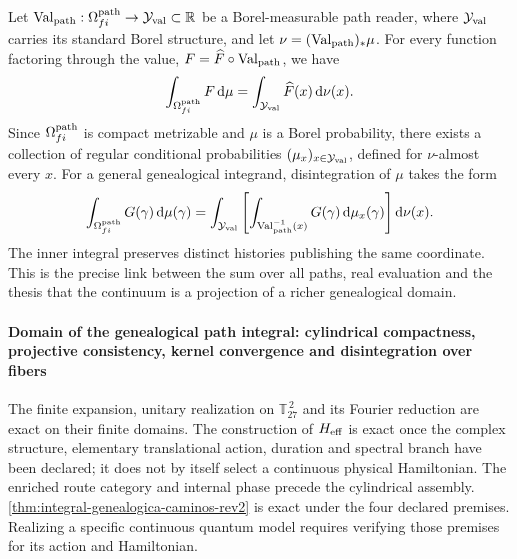 Let
\(\operatorname{Val}_{\rm path}:\Omega^{\rm path}_{fi}\to\mathcal Y_{\rm val}\subset\mathbb R\)
be a Borel-measurable path reader, where \(\mathcal Y_{\rm val}\) carries its standard
Borel structure, and let
\(\nu=(\operatorname{Val}_{\rm path})_*\mu\). For every function
factoring through the value, \(F=\widehat F\circ\operatorname{Val}_{\rm path}\),
we have
\[
 \int_{\Omega^{\rm path}_{fi}}F\,\mathrm d\mu
 =\int_{\mathcal Y_{\rm val}}\widehat F(x)\,\mathrm d\nu(x).
\]
Since \(\Omega^{\rm path}_{fi}\) is compact metrizable and \(\mu\) is a
Borel probability, there exists a collection of regular conditional
probabilities \((\mu_x)_{x\in\mathcal Y_{\rm val}}\), defined for \(\nu\)-almost every \(x\). For
a general genealogical integrand, disintegration of \(\mu\) takes the form
\begin{equation}
 \int_{\Omega^{\rm path}_{fi}}G(\gamma)\,\mathrm d\mu(\gamma)
 =\int_{\mathcal Y_{\rm val}}\left[
   \int_{\operatorname{Val}_{\rm path}^{-1}(x)}
   G(\gamma)\,\mathrm d\mu_x(\gamma)
  \right]\mathrm d\nu(x).
 \label{eq:desintegracion-genealogica-caminos-rev2}
\end{equation}
The inner integral preserves distinct histories publishing the same
coordinate. This is the precise link between the sum over all paths,
real evaluation and the thesis that the continuum is a projection of
a richer genealogical domain.

\paragraph{Domain of the genealogical path integral: cylindrical compactness, projective consistency, kernel convergence and disintegration over fibers}
The finite expansion, unitary realization on
\(\mathbb T_{27}^{\,2}\) and its Fourier reduction are exact on their finite
domains. The construction of \(H_{\rm eff}\) is
exact once the complex structure, elementary translational
action, duration and spectral branch have been declared; it does not by itself select a
continuous physical Hamiltonian. The enriched route category and internal
phase precede the cylindrical assembly.
\cref{thm:integral-genealogica-caminos-rev2} is exact under the four
declared premises. Realizing a specific continuous quantum model
requires verifying those premises for its action and Hamiltonian.

